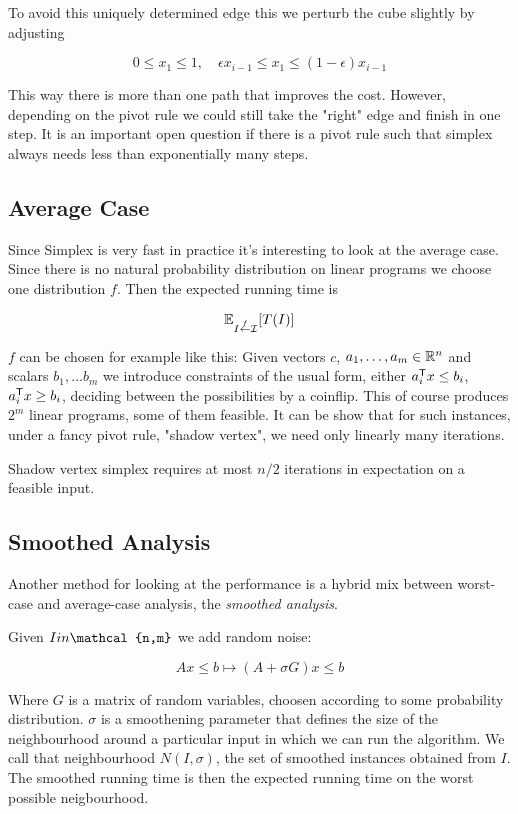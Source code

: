 To avoid this uniquely determined edge this we perturb the cube slightly by adjusting 

\[0\leq x_1 \leq 1, \quad \epsilon x_{i-1} \leq x_1 \leq (1-\epsilon)x_{i-1}\]

This way there is more than one path that improves the cost. However, depending on the pivot rule we could still take the "right" edge and finish in one step. It is an important open question if there is a pivot rule such that simplex always needs less than exponentially many steps.

\subsection{Average Case}

Since Simplex is very fast in practice it's interesting to look at the average case. Since there is no natural probability distribution on linear programs we choose one distribution $f$. Then the expected running time is

\[\mathbb{E}_{I \stackrel{f}{\leftarrow}\mathcal{I}}[T(I)]\]

$f$ can be chosen for example like this: Given vectors $c$, $a_1,\ldots, a_m\in \mathbb{R}^n$ and scalars $b_1,\ldots b_m$ we introduce constraints of the usual form, either ${a}^\text{\upshape \sffamily T}_i x \leq b_i$, ${a}^\text{\upshape \sffamily T}_ix\geq b_i$, deciding between the possibilities by a coinflip. This of course produces $2^m$ linear programs, some of them feasible. It can be show that for such instances, under a fancy pivot rule, "shadow vertex", we need only linearly many iterations.

\begin{thm}[Haimich '83] Shadow vertex simplex requires at most $n/2$ iterations in expectation on a feasible input.\end{thm}

\subsection{Smoothed Analysis}

Another method for looking at the performance is a hybrid mix between worst-case and average-case analysis, the \emph{smoothed analysis}.

Given $I\\in \mathcal{n,m}$ we add random noise:

\[Ax\leq b \mapsto (A+\sigma G)x\leq b\]

Where $G$ is a matrix of random variables, choosen according to some probability distribution. $\sigma$ is a smoothening parameter that defines the size of the neighbourhood around a particular input in which we can run the algorithm. We call that neighbourhood $N(I,\sigma)$, the set of smoothed instances obtained from $I$. The smoothed running time is then the expected running time on the worst possible neigbourhood.

